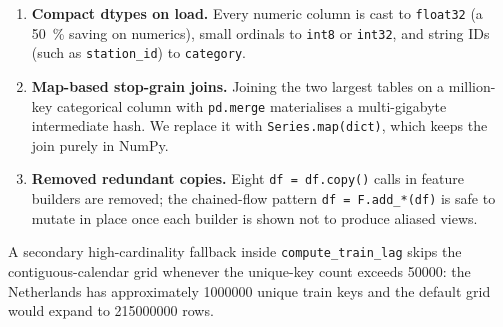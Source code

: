 \begin{enumerate}
    \item \textbf{Compact dtypes on load.} Every numeric column is cast to \texttt{float32} (a \SI{50}{\percent} saving on numerics), small ordinals to \texttt{int8} or \texttt{int32}, and string IDs (such as \texttt{station\_id}) to \texttt{category}.
    \item \textbf{Map-based stop-grain joins.} Joining the two largest tables on a million-key categorical column with \texttt{pd.merge} materialises a multi-gigabyte intermediate hash. We replace it with \texttt{Series.map(dict)}, which keeps the join purely in NumPy.
    \item \textbf{Removed redundant copies.} Eight \texttt{df = df.copy()} calls in feature builders are removed; the chained-flow pattern \texttt{df = F.add\_*(df)} is safe to mutate in place once each builder is shown not to produce aliased views.
\end{enumerate}

A secondary high-cardinality fallback inside \texttt{compute\_train\_lag} skips the contiguous-calendar grid whenever the unique-key count exceeds \num{50000}: the Netherlands has approximately \num{1000000} unique train keys and the default grid would expand to \num{215000000} rows.
